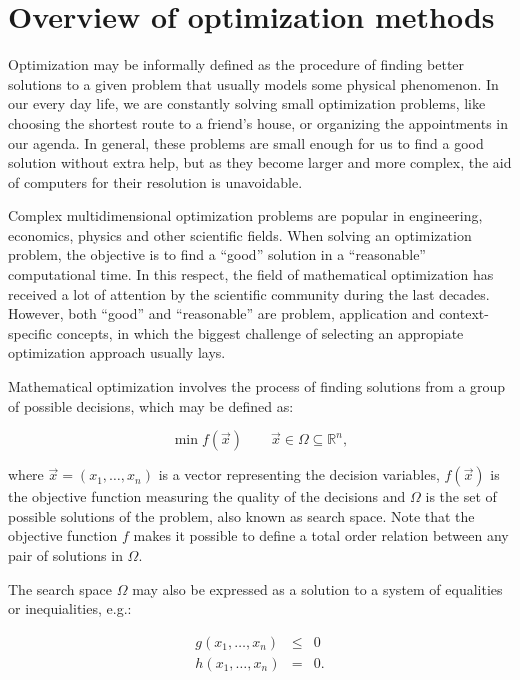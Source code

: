 
\chapter{Overview of optimization methods \label{chap:02-Optimization_models}}


\noindent Optimization may be informally defined as the procedure
of finding better solutions to a given problem that usually models
some physical phenomenon. In our every day life, we are constantly
solving small optimization problems, like choosing the shortest route
to a friend's house, or organizing the appointments in our agenda.
In general, these problems are small enough for us to find a good
solution without extra help, but as they become larger and more complex,
the aid of computers for their resolution is unavoidable.

Complex multidimensional optimization problems are popular in engineering,
economics, physics and other scientific fields. When solving an optimization
problem, the objective is to find a ``good'' solution in a ``reasonable''
computational time. In this respect, the field of mathematical optimization
has received a lot of attention by the scientific community during
the last decades. However, both ``good'' and ``reasonable'' are
problem, application and context-specific concepts, in which the biggest
challenge of selecting an appropiate optimization approach usually
lays.

Mathematical optimization involves the process of finding solutions
from a group of possible decisions, which may be defined as:

\begin{equation}
\min f(\vec{x})\qquad\vec{x}\in\Omega\subseteq\mathbb{R}^{n},
\end{equation}


\noindent where $\vec{x}=(x_{1},\dots,x_{n})$ is a vector representing
the decision variables, $f(\vec{x})$ is the objective function measuring
the quality of the decisions and $\Omega$ is the set of possible
solutions of the problem, also known as search space. Note that the
objective function $f$ makes it possible to define a total order
relation between any pair of solutions in $\Omega$.

The search space $\Omega$ may also be expressed as a solution to
a system of equalities or inequialities, e.g.:

\begin{eqnarray}
g(x_{1},\dots,x_{n}) & \leq & 0\nonumber \\
h(x_{1},\dots,x_{n}) & = & 0.
\end{eqnarray}


